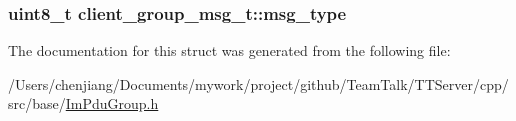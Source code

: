 \subsubsection[{msg\+\_\+type}]{\setlength{\rightskip}{0pt plus 5cm}uint8\+\_\+t client\+\_\+group\+\_\+msg\+\_\+t\+::msg\+\_\+type}\label{structclient__group__msg__t_a6d4cb58988d4b9a1a462b4673c39a1ba}


The documentation for this struct was generated from the following file\+:\begin{DoxyCompactItemize}
\item 
/\+Users/chenjiang/\+Documents/mywork/project/github/\+Team\+Talk/\+T\+T\+Server/cpp/src/base/\hyperlink{_im_pdu_group_8h}{Im\+Pdu\+Group.\+h}\end{DoxyCompactItemize}
